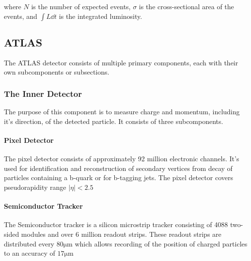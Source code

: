 \documentclass[12pt,a4paper]{article}
\begin{document}
where $N$ is the number of expected events, $\sigma$ is the cross-sectional area of
the events, and $\int L \dd t$ is the integrated luminosity.

\subsection{ATLAS}


The ATLAS detector consists of multiple primary components, each with their own
subcomponents or subsections.

\subsubsection{The Inner Detector}

The purpose of this component is to measure charge and momentum, including it's
direction, of the detected particle. It consists of three subcomponents. 
\paragraph{Pixel Detector}
The pixel detector consists of approximately 92 million electronic channels. It's used for identification and reconstruction of secondary vertices from decay of particles containing a b-quark or for b-tagging jets. The pixel detector covers pseudorapidity range $|\eta| < 2.5 $ 

\paragraph{Semiconductor Tracker}
The Semiconductor tracker is a silicon microstrip tracker consisting of 4088 two-sided modules and over 6 million readout strips. These readout strips are distributed every $80\mathrm{\mu m}$ which allows recording of the position of charged particles to an accuracy of  $17\mathrm{\mu m}$
\end{document}
